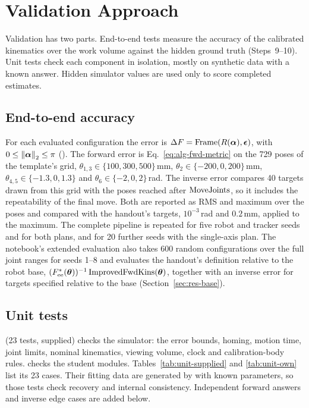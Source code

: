 \documentclass[../main.tex]{subfiles}
\begin{document}
\section{Validation Approach}\label{sec:validation}
Validation has two parts. End-to-end tests measure the accuracy of the calibrated kinematics over the work volume against the hidden ground truth (Steps~9--10). Unit tests check each component in isolation, mostly on synthetic data with a known answer. Hidden simulator values are used only to score completed estimates.

\subsection{End-to-end accuracy}
For each evaluated configuration the error is $\Delta F=\operatorname{Frame}(R(\bm{\alpha}),\bm{\epsilon})$, with $0\leq\left\|\bm{\alpha}\right\|_2\leq\pi$ (). The forward error is Eq.~\eqref{eq:alg-fwd-metric} on the 729 poses of the template's grid, $\theta_{1,3}\in\{100,300,500\}$\,mm, $\theta_2\in\{-200,0,200\}$\,mm, $\theta_{4,5}\in\{-1.3,0,1.3\}$ and $\theta_6\in\{-2,0,2\}$\,rad. The inverse error compares 40 targets drawn from this grid with the poses reached after $\operatorname{MoveJoints}$, so it includes the repeatability of the final move. Both are reported as RMS and maximum over the poses and compared with the handout's targets, $10^{-3}$\,rad and $0.2$\,mm, applied to the maximum. The complete pipeline is repeated for five robot and tracker seeds and for both plans, and for 20 further seeds with the single-axis plan. The notebook's extended evaluation also takes 600 random configurations over the full joint ranges for seeds 1--8 and evaluates the handout's definition relative to the robot base, $(F^*_{\mathrm{ee}}(\bm{\theta}))^{-1}\operatorname{ImprovedFwdKins}(\bm{\theta})$, together with an inverse error for targets specified relative to the base (Section~\ref{sec:res-base}).

\subsection{Unit tests}
 (23 tests, supplied) checks the simulator: the error bounds, homing, motion time, joint limits, nominal kinematics, viewing volume, clock and calibration-body rules.  checks the student modules. Tables~\ref{tab:unit-supplied} and \ref{tab:unit-own} list its 23 cases. Their fitting data are generated by  with known parameters, so those tests check recovery and internal consistency. Independent forward answers and inverse edge cases are added below.
\end{document}
